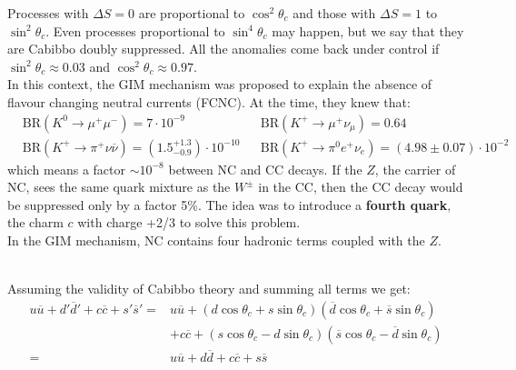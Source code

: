 \documentclass[10.75pt,a4paper,openright,bottom=2cm]{article}
\begin{document}
Processes with $\Delta S=0$ are proportional to $\cos^2\theta_c$ and those with $\Delta S=1$ to $\sin^2\theta_c$. Even processes proportional to $\sin^4\theta_c$ may happen, but we say that they are Cabibbo doubly suppressed. All the anomalies come back under control if $\sin^2\theta_c\approx0.03$ and $\cos^2\theta_c\approx0.97$.\\
In this context, the GIM mechanism was proposed to explain the absence of flavour changing neutral currents (FCNC). At the time, they knew that:
\[
\begin{aligned}
&\text{BR}(K^0\to\mu^+\mu^-)=7\cdot10^{-9} &&\text{BR}(K^+\to\mu^+\nu_\mu)=0.64\\
&\text{BR}(K^+\to\pi^+\nu\overline{\nu})=(1.5^{+1.3}_{-0.9})\cdot10^{-10} &&\text{BR}(K^+\to\pi^0e^+\nu_e)=(4.98\pm0.07)\cdot10^{-2}
\end{aligned}
\]
which means a factor $\sim10^{-8}$ between NC and CC decays. If the $Z$, the carrier of NC, sees the same quark mixture as the $W^\pm$ in the CC, then the CC decay would be suppressed only by a factor 5\%. The idea was to introduce a \textbf{fourth quark}, the charm $c$ with charge +2/3 to solve this problem.\\
In the GIM mechanism, NC contains four hadronic terms coupled with the $Z$.\\
\begin{center}
\end{center}\\
Assuming the validity of Cabibbo theory and summing all terms we get:
\begin{align*}
u\overline{u}+d'\overline{d}'+c\overline{c}+s'\overline{s}'=&u\overline{u}+(d\cos\theta_c+s\sin\theta_c)(\overline{d}\cos\theta_c+\overline{s}\sin\theta_c)\\
&+c\overline{c}+(s\cos\theta_c-d\sin\theta_c)(\overline{s}\cos\theta_c-\overline{d}\sin\theta_c)\\
=&u\overline{u}+d\overline{d}+c\overline{c}+s\overline{s}
\end{align*}
\end{document}
